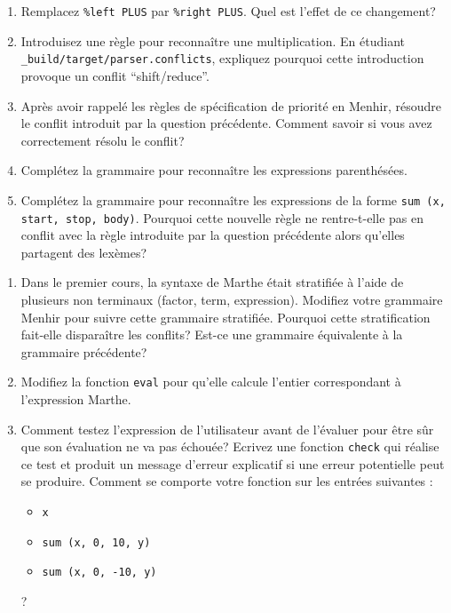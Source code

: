 \documentclass{article}
\begin{document}
\begin{exercise}
  \-
  \begin{enumerate}
  \item
    Remplacez \verb!%left PLUS! par \verb!%right PLUS!. Quel est l'effet
    de ce changement?

  \item
    Introduisez une règle pour reconnaître une multiplication. En étudiant
    \verb!_build/target/parser.conflicts!, expliquez pourquoi cette introduction
    provoque un conflit ``shift/reduce''.

  \item
    Après avoir rappelé les règles de spécification de priorité en Menhir,
    résoudre le conflit introduit par la question précédente. Comment savoir
    si vous avez correctement résolu le conflit?

  \item
    Complétez la grammaire pour reconnaître les expressions parenthésées.

  \item
    Complétez la grammaire pour reconnaître les expressions de la
    forme \verb!sum (x, start, stop, body)!. Pourquoi cette nouvelle
    règle ne rentre-t-elle pas en conflit avec la règle introduite par
    la question précédente alors qu'elles partagent des lexèmes?
  \end{enumerate}
\end{exercise}

\begin{exercise}
  \-
  \begin{enumerate}
  \item
    Dans le premier cours, la syntaxe de Marthe était stratifiée à l'aide de
    plusieurs non terminaux (factor, term, expression).  Modifiez votre
    grammaire Menhir pour suivre cette grammaire stratifiée. Pourquoi cette
    stratification fait-elle disparaître les conflits? Est-ce une grammaire
    équivalente à la grammaire précédente?

  \item
    Modifiez la fonction \verb!eval! pour qu'elle calcule l'entier correspondant
    à l'expression Marthe.

  \item
    Comment testez l'expression de l'utilisateur avant de l'évaluer pour être
    sûr que son évaluation ne va pas échouée? Ecrivez une fonction \verb!check!
    qui réalise ce test et produit un message d'erreur explicatif si une erreur
    potentielle peut se produire. Comment se comporte votre fonction sur les
    entrées suivantes :
    \begin{itemize}
    \item \verb!x!
    \item \verb!sum (x, 0, 10, y)!
    \item \verb!sum (x, 0, -10, y)!
    \end{itemize}
    ?

  \end{enumerate}
\end{exercise}
\end{document}
